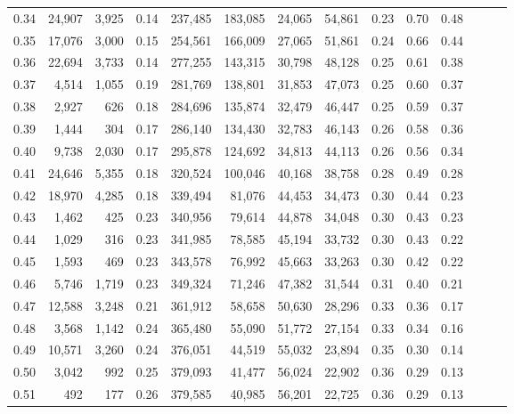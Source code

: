 \begin{tabular}{rrrrrrrrrrrrrr}
0.34 &  24,907 &  3,925 &  0.14 &  237,485 &  183,085 &  24,065 &  54,861 &  0.23 &  0.70 &      0.48 \\
0.35 &  17,076 &  3,000 &  0.15 &  254,561 &  166,009 &  27,065 &  51,861 &  0.24 &  0.66 &      0.44 \\
0.36 &  22,694 &  3,733 &  0.14 &  277,255 &  143,315 &  30,798 &  48,128 &  0.25 &  0.61 &      0.38 \\
0.37 &   4,514 &  1,055 &  0.19 &  281,769 &  138,801 &  31,853 &  47,073 &  0.25 &  0.60 &      0.37 \\
0.38 &   2,927 &    626 &  0.18 &  284,696 &  135,874 &  32,479 &  46,447 &  0.25 &  0.59 &      0.37 \\
0.39 &   1,444 &    304 &  0.17 &  286,140 &  134,430 &  32,783 &  46,143 &  0.26 &  0.58 &      0.36 \\
0.40 &   9,738 &  2,030 &  0.17 &  295,878 &  124,692 &  34,813 &  44,113 &  0.26 &  0.56 &      0.34 \\
0.41 &  24,646 &  5,355 &  0.18 &  320,524 &  100,046 &  40,168 &  38,758 &  0.28 &  0.49 &      0.28 \\
0.42 &  18,970 &  4,285 &  0.18 &  339,494 &   81,076 &  44,453 &  34,473 &  0.30 &  0.44 &      0.23 \\
0.43 &   1,462 &    425 &  0.23 &  340,956 &   79,614 &  44,878 &  34,048 &  0.30 &  0.43 &      0.23 \\
0.44 &   1,029 &    316 &  0.23 &  341,985 &   78,585 &  45,194 &  33,732 &  0.30 &  0.43 &      0.22 \\
0.45 &   1,593 &    469 &  0.23 &  343,578 &   76,992 &  45,663 &  33,263 &  0.30 &  0.42 &      0.22 \\
0.46 &   5,746 &  1,719 &  0.23 &  349,324 &   71,246 &  47,382 &  31,544 &  0.31 &  0.40 &      0.21 \\
0.47 &  12,588 &  3,248 &  0.21 &  361,912 &   58,658 &  50,630 &  28,296 &  0.33 &  0.36 &      0.17 \\
0.48 &   3,568 &  1,142 &  0.24 &  365,480 &   55,090 &  51,772 &  27,154 &  0.33 &  0.34 &      0.16 \\
0.49 &  10,571 &  3,260 &  0.24 &  376,051 &   44,519 &  55,032 &  23,894 &  0.35 &  0.30 &      0.14 \\
0.50 &   3,042 &    992 &  0.25 &  379,093 &   41,477 &  56,024 &  22,902 &  0.36 &  0.29 &      0.13 \\
0.51 &     492 &    177 &  0.26 &  379,585 &   40,985 &  56,201 &  22,725 &  0.36 &  0.29 &      0.13 \\

\end{tabular}
